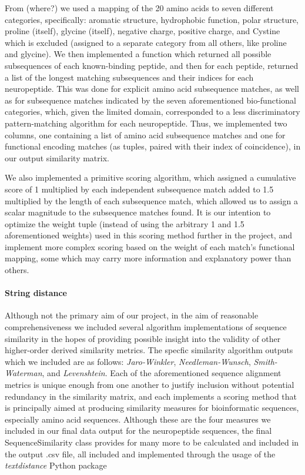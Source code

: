 \documentclass[]{article}
\let\oldparagraph\paragraph
\renewcommand{\paragraph}[1]{\oldparagraph{#1}\mbox{}}
\begin{document}
From (where?) we used a mapping of the 20 amino acids to seven different categories, specifically: aromatic structure, hydrophobic function, polar structure, proline (itself), glycine (itself), negative charge, positive charge, and Cystine which is excluded (assigned to a separate category from all others, like proline and glycine). We then implemented a function which returned all possible subsequences of each known-binding peptide, and then for each peptide, returned a list of the longest matching subsequences and their indices for each neuropeptide. This was done for explicit amino acid subsequence matches, as well as for subsequence matches indicated by the seven aforementioned bio-functional categories, which, given the limited domain, corresponded to a less discriminatory pattern-matching algorithm for each neuropeptide. Thus, we implemented two columns, one containing a list of amino acid subsequence matches and one for functional encoding matches (as tuples, paired with their index of coincidence), in our output similarity matrix.

We also implemented a primitive scoring algorithm, which assigned a cumulative score of 1 multiplied by each independent subsequence match added to 1.5 multiplied by the length of each subsequence match, which allowed us to assign a scalar magnitude to the subsequence matches found. It is our intention to optimize the weight tuple (instead of using the arbitrary 1 and 1.5 aforementioned weights) used in this scoring method further in the project, and implement more complex scoring based on the weight of each match's functional mapping, some which may carry more information and explanatory power than others.

\hypertarget{string-distance}{%
\paragraph{String distance}\label{string-distance}}

Although not the primary aim of our project, in the aim of reasonable comprehensiveness we included several algorithm implementations of sequence similarity in the hopes of providing possible insight into the validity of other higher-order derived similarity metrics. The specfic similarity algorithm outputs which we included are as follows: \emph{Jaro-Winkler}, \emph{Needleman-Wunsch}, \emph{Smith-Waterman}, and \emph{Levenshtein}. Each of the aforementioned sequence alignment metrics is unique enough from one another to justify inclusion without potential redundancy in the similarity matrix, and each implements a scoring method that is principally aimed at producing similarity measures for bioinformatic sequences, especially amino acid sequences. Although these are the four measures we included in our final data output for the neuropeptide sequences, the final SequenceSimilarity class provides for many more to be calculated and included in the output .csv file, all included and implemented through the usage of the \emph{textdistance} Python package \cite{omnium_textdistance_2019}
\end{document}
